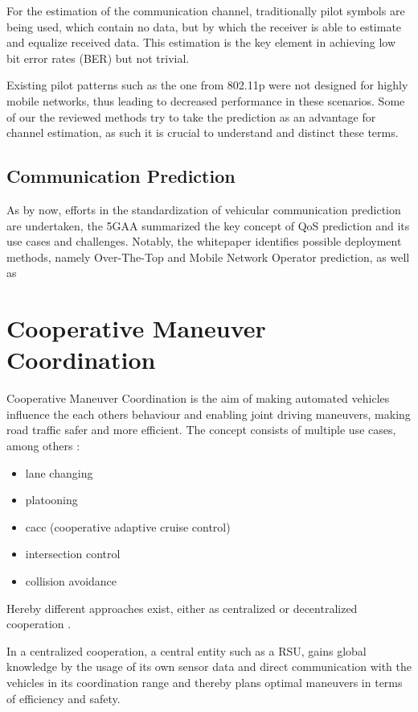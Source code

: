 \documentclass[conference]{IEEEtran}
\begin{document}
For the estimation of the communication channel, traditionally pilot symbols are being used, which contain no data, but by which the receiver is able to estimate and equalize received data. This estimation is the key element in achieving low bit error rates (BER) but not trivial. 

Existing pilot patterns such as the one from 802.11p were not designed for highly mobile networks, thus leading to decreased performance in these scenarios. Some of our the reviewed methods try to take the prediction as an advantage for channel estimation, as such it is crucial to understand and distinct these terms.
\subsection{Communication Prediction}
As by now, efforts in the standardization of vehicular communication prediction are undertaken, the 5GAA summarized the key concept of QoS prediction and its use cases and challenges. Notably, the whitepaper identifies possible deployment methods, namely Over-The-Top and Mobile Network Operator prediction, as well as  

\section{Cooperative Maneuver Coordination}
Cooperative Maneuver Coordination is the aim of making automated vehicles influence the each others behaviour and enabling joint driving maneuvers, making road traffic safer and more efficient.
The concept consists of multiple use cases, among others \cite{bobanConnectedRoadsFuture2018}:
\begin{itemize}
\item lane changing
\item platooning
\item cacc (cooperative adaptive cruise control)
\item intersection control
\item collision avoidance
\end{itemize}
Hereby different approaches exist, either as centralized \cite{mengluICTInfrastructureCooperative2018} or decentralized cooperation \cite{llatserCooperativeAutomatedDriving2019,fortelleNetworkAutomatedVehicles2014}.

In a centralized cooperation, a central entity such as a RSU, gains global knowledge by the usage of its own sensor data and direct communication with the vehicles in its coordination range and thereby plans optimal maneuvers in terms of efficiency and safety.
\end{document}
